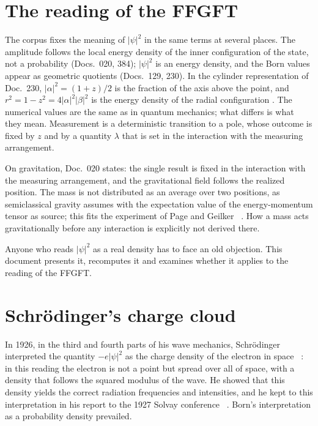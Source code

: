 \section{The reading of the FFGFT}

The corpus fixes the meaning of $|\psi|^2$ in the same terms at several places. The amplitude follows
the local energy density of the inner configuration of the state, not a probability (Docs.~020, 384);
$|\psi|^2$ is an energy density, and the Born values appear as geometric quotients (Docs.~129, 230).
In the cylinder representation of Doc.~230, $|\alpha|^2=(1+z)/2$ is the fraction of the axis above
the point, and $r^2=1-z^2=4|\alpha|^2|\beta|^2$ is the energy density of the radial configuration
\BM. The numerical values are the same as in quantum mechanics; what differs is what they mean.
Measurement is a deterministic transition to a pole, whose outcome is fixed by $z$ and by a quantity
$\lambda$ that is set in the interaction with the measuring arrangement.

On gravitation, Doc.~020 states: the single result is fixed in the interaction with the measuring
arrangement, and the gravitational field follows the realized position. The mass is not distributed
as an average over two positions, as semiclassical gravity assumes with the expectation value of the
energy-momentum tensor as source; this fits the experiment of Page and Geilker
\QM~\cite{PageGeilker1981}. How a mass acts gravitationally before any interaction is explicitly not
derived there.

Anyone who reads $|\psi|^2$ as a real density has to face an old objection. This document presents
it, recomputes it and examines whether it applies to the reading of the FFGFT.

\section{Schrödinger's charge cloud}

In 1926, in the third and fourth parts of his wave mechanics, Schrödinger interpreted the quantity
$-e|\psi|^2$ as the charge density of the electron in space \QM~\cite{Schroedinger1926}: in this
reading the electron is not a point but spread over all of space, with a density that follows the
squared modulus of the wave. He showed that this density yields the correct radiation frequencies
and intensities, and he kept to this interpretation in his report to the 1927 Solvay conference
\QM~\cite{BacciagaluppiValentini2009}. Born's interpretation as a probability density prevailed.

